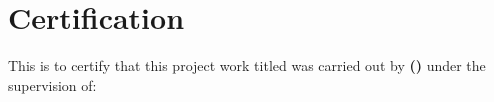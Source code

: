 \chapter*{Certification}

This is to certify that this project work titled \textbf{\thesistitle} was carried out by \textbf{\thesisauthor (\studentid)} under the supervision of:

\vspace{1.0cm}

\vspace{1.0cm}

